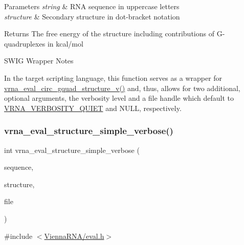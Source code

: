 \begin{DoxyParams}{Parameters}
{\em string} & R\+NA sequence in uppercase letters \\
\hline
{\em structure} & Secondary structure in dot-\/bracket notation \\
\hline
\end{DoxyParams}
\begin{DoxyReturn}{Returns}
The free energy of the structure including contributions of G-\/quadruplexes in kcal/mol
\end{DoxyReturn}
\begin{DoxyRefDesc}{S\+W\+I\+G Wrapper Notes}
\item[\mbox{\hyperlink{wrappers__wrappers000038}{S\+W\+I\+G Wrapper Notes}}]In the target scripting language, this function serves as a wrapper for \mbox{\hyperlink{group__eval_gab96a6c59923ff06c35f8c2fd2c239727}{vrna\+\_\+eval\+\_\+circ\+\_\+gquad\+\_\+structure\+\_\+v()}} and, thus, allows for two additional, optional arguments, the verbosity level and a file handle which default to \mbox{\hyperlink{eval_8h_af4afe19780b61b4962c613bde324128b}{V\+R\+N\+A\+\_\+\+V\+E\+R\+B\+O\+S\+I\+T\+Y\+\_\+\+Q\+U\+I\+ET}} and N\+U\+LL, respectively. \end{DoxyRefDesc}
\mbox{\label{group__eval_gaf928bfd96767e1b8033a95a4cc432e39}} 
\subsubsection{\texorpdfstring{vrna\+\_\+eval\+\_\+structure\+\_\+simple\+\_\+verbose()}{vrna\_eval\_structure\_simple\_verbose()}}
{\footnotesize\ttfamily int vrna\+\_\+eval\+\_\+structure\+\_\+simple\+\_\+verbose (\begin{DoxyParamCaption}\item[{const char $\ast$}]{sequence,  }\item[{const char $\ast$}]{structure,  }\item[{F\+I\+LE $\ast$}]{file }\end{DoxyParamCaption})}



{\ttfamily \#include $<$\mbox{\hyperlink{eval_8h}{Vienna\+R\+N\+A/eval.\+h}}$>$}



